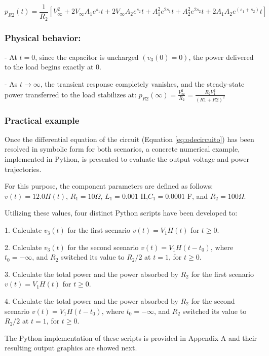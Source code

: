 \documentclass[energies,accept,oneauthor,pdftex]{Definitions/mdpi}
\begin{document}
\[
p_{R2} (t) = \frac{1}{R_2}[ V_{\infty}^2
+ 2V_{\infty} A_1 e^{s_1} t + 2V_{\infty} A_2 e^{s_2}t + A^2_{1} e^{2s_1}t + A^2_{2} e^{2s_2}t
 + 2A_1 A_{2}e^{(s_1+s_2)} t]
\]

\subsubsection*{Physical behavior:}

- At $t = 0$, since the capacitor is uncharged $(v_3 (0) = 0)$, the power delivered to the load begins exactly at 0.

\noindent
- As $t \to\infty$, the transient response completely vanishes, and the steady-state power transferred to the load stabilizes at:
$p_{R2} (\infty) = \frac{V_{\infty}^2}{R_2} = \frac{R_2V_1^2}{(R1 +R2)^2}$



\subsubsection{Practical example}
Once the differential equation of the circuit (Equation \ref{eq:odecircuito}) has been resolved in symbolic form for both scenarios, a concrete numerical example, implemented in Python, is presented to evaluate the output
voltage and power trajectories.

For this purpose, the component parameters are defined as follows: $v(t) = 12.0 H(t)$, $R_1 = 10 \Omega$, $L_1 = 0.001$ H,$ C_1 = 0.0001$ F, and $R_2 = 100 \Omega$.

Utilizing these values, four distinct Python scripts have been developed to:

1. Calculate $v_3 (t)$ for the first scenario $v(t) = V_1 H(t)$ for $t \ge 0$.

2. Calculate $v_3 (t)$ for the second scenario $v(t) = V_1 H(t - t_0 )$, where $t_0 = -\infty $, and $R_2$ switched its value to $R_2 /2$ at $t = 1$, for $t\ge 0$.

3. Calculate the total power and the power absorbed by $R_2$ for the first scenario $v(t) = V_1 H(t)$ for $t \ge 0$.

4. Calculate the total power and the power absorbed by $R_2$ for the second scenario  $v(t) = V_1 H(t - t_0 )$, where $t_0 = -\infty$, and $R_2$ switched its value to $R_2 /2$ at $t = 1$, for $t \ge 0$.

\medskip

The Python implementation of these scripts is provided in Appendix A and their
resulting output graphics are showed next.
\end{document}
